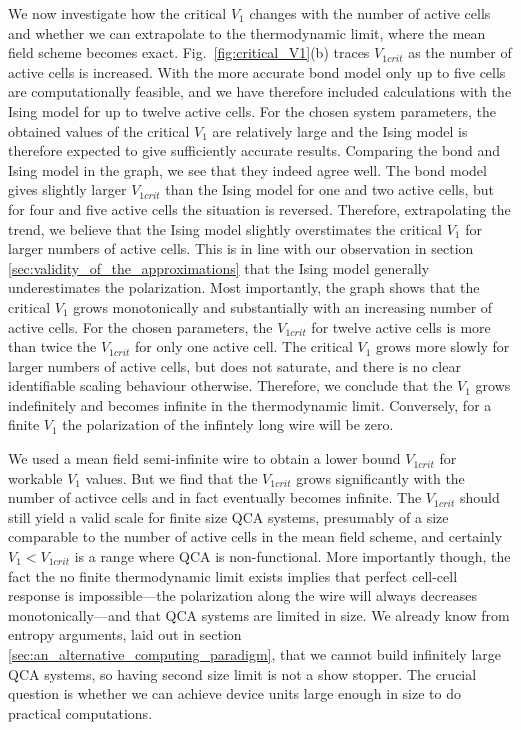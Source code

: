 We now investigate how the critical $V_1$ changes with the number of active
cells and whether we can extrapolate to the thermodynamic limit, where the mean
field scheme becomes exact. Fig.~\ref{fig:critical_V1}(b) traces $V_{1crit}$ as
the number of active cells is increased. With the more accurate bond model only
up to five cells are computationally feasible, and we have therefore included
calculations with the Ising model for up to twelve active cells. For the chosen
system parameters, the obtained values of the critical $V_1$ are relatively
large and the Ising model is therefore expected to give sufficiently accurate
results. Comparing the bond and Ising model in the graph, we see that they
indeed agree well. The bond model gives slightly larger $V_{1crit}$ than the
Ising model for one and two active cells, but for four and five active cells the
situation is reversed. Therefore, extrapolating the trend, we believe that the
Ising model slightly overstimates the critical $V_1$ for larger numbers of
active cells. This is in line with our observation in section
\ref{sec:validity_of_the_approximations} that the Ising model generally
underestimates the polarization. Most importantly, the graph shows that the
critical $V_1$ grows monotonically and substantially with an increasing number
of active cells. For the chosen parameters, the $V_{1crit}$ for twelve active
cells is more than twice the $V_{1crit}$ for only one active cell. The critical
$V_1$ grows more slowly for larger numbers of active cells, but does not
saturate, and there is no clear identifiable scaling behaviour otherwise.
Therefore, we conclude that the $V_1$ grows indefinitely and becomes infinite in
the thermodynamic limit. Conversely, for a finite $V_1$ the polarization of the
infintely long wire will be zero.

We used a mean field semi-infinite wire to obtain a lower bound $V_{1crit}$ for
workable $V_1$ values. But we find that the $V_{1crit}$ grows significantly with
the number of activce cells and in fact eventually becomes infinite. The
$V_{1crit}$ should still yield a valid scale for finite size QCA systems,
presumably of a size comparable to the number of active cells in the mean field
scheme, and certainly $V_1 < V_{1crit}$ is a range where QCA is non-functional.
More importantly though, the fact the no finite thermodynamic limit exists
implies that perfect cell-cell response is impossible---the polarization along
the wire will always decreases monotonically---and that QCA systems are limited
in size. We already know from entropy arguments, laid out in section
\ref{sec:an_alternative_computing_paradigm}, that we cannot build infinitely
large QCA systems, so having second size limit is not a show stopper. The
crucial question is whether we can achieve device units large enough in size to
do practical computations.

